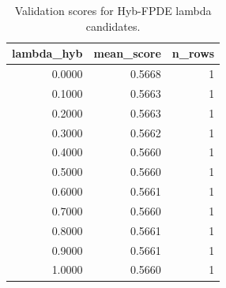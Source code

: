 \begin{table}[t]
\caption{Validation scores for Hyb-FPDE lambda candidates.}
\label{tab:lambda_distribution_computed}
\centering
\begin{tabular}{rrr}
\toprule
lambda\_hyb & mean\_score & n\_rows \\
\midrule
0.0000 & 0.5668 & 1 \\
0.1000 & 0.5663 & 1 \\
0.2000 & 0.5663 & 1 \\
0.3000 & 0.5662 & 1 \\
0.4000 & 0.5660 & 1 \\
0.5000 & 0.5660 & 1 \\
0.6000 & 0.5661 & 1 \\
0.7000 & 0.5660 & 1 \\
0.8000 & 0.5661 & 1 \\
0.9000 & 0.5661 & 1 \\
1.0000 & 0.5660 & 1 \\
\bottomrule
\end{tabular}

\end{table}
